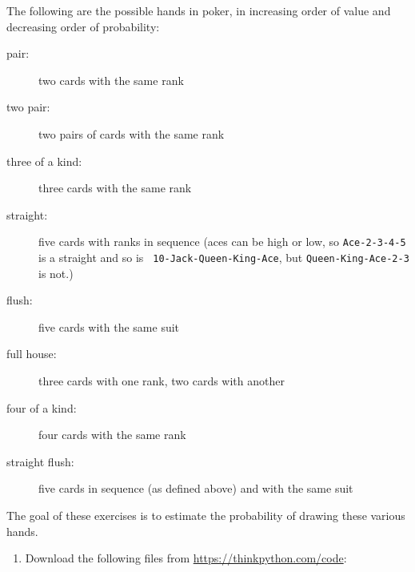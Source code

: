 \documentclass[10pt]{book}
\begin{document}
\begin{exercise}
\label{poker}

The following are the possible hands in poker, in increasing order
of value and decreasing order of probability:

\begin{description}

\item[pair:] two cards with the same rank
\vspace{-0.05in}

\item[two pair:] two pairs of cards with the same rank
\vspace{-0.05in}

\item[three of a kind:] three cards with the same rank
\vspace{-0.05in}

\item[straight:] five cards with ranks in sequence (aces can
be high or low, so {\tt Ace-2-3-4-5} is a straight and so is {\tt
10-Jack-Queen-King-Ace}, but {\tt Queen-King-Ace-2-3} is not.)
\vspace{-0.05in}

\item[flush:] five cards with the same suit
\vspace{-0.05in}

\item[full house:] three cards with one rank, two cards with another
\vspace{-0.05in}

\item[four of a kind:] four cards with the same rank
\vspace{-0.05in}

\item[straight flush:] five cards in sequence (as defined above) and
with the same suit
\vspace{-0.05in}

\end{description}
%
The goal of these exercises is to estimate
the probability of drawing these various hands.

\begin{enumerate}

\item Download the following files from \url{https://thinkpython.com/code}:

\begin{description}


\end{description}
\end{enumerate}
\end{exercise}
\end{document}
